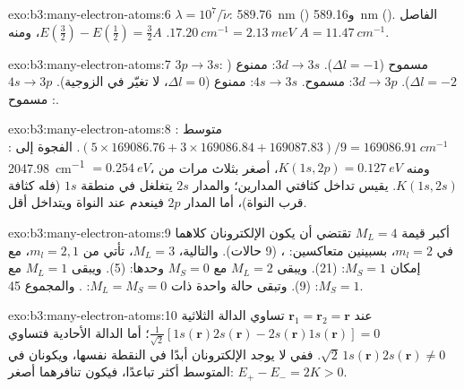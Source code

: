 \begin{solution}{exo:b3:many-electron-atoms:6}
$\lambda = 10^7/\tilde\nu$: \qty{589.76}{nm} () و\qty{589.16}{nm}
(). الفاصل $\qty{17.20}{cm^{-1}} = \qty{2.13}{meV}$. $E(\frac32) -
E(\frac12) = \frac32A$، ومنه $A = \qty{11.47}{cm^{-1}}$.
\end{solution}

\begin{solution}{exo:b3:many-electron-atoms:7}
$3p \to 3s$: مسموح ($\Delta l = -1$). $3d \to 3s$: ممنوع ($\Delta l = -2$).
$3d \to 3p$: مسموح. $4s \to 3s$: ممنوع ($\Delta l = 0$، لا تغيّر في
الزوجية). $4s \to 3p$: مسموح.
\end{solution}

\begin{solution}{exo:b3:many-electron-atoms:8}
متوسط : $(5 \times 169086.76 + 3 \times 169086.84 + 169087.83)/9 =
\qty{169086.91}{cm^{-1}}$. الفجوة إلى : \qty{2047.98}{cm^{-1}} $=
\qty{0.254}{eV}$، ومنه $K(1s,2p) = \qty{0.127}{eV}$، أصغر بثلاث مرات من
$K(1s,2s)$.  يقيس تداخل كثافتي
المدارين؛ والمدار $2s$ يتغلغل في منطقة $1s$ (فله كثافة
قرب النواة)، أما المدار $2p$ فينعدم عند النواة ويتداخل أقل.
\end{solution}

\begin{solution}{exo:b3:many-electron-atoms:9}
أكبر قيمة $M_L = 4$ تقتضي أن يكون الإلكترونان كلاهما في $m_l = 2$، بسبينين متعاكسين: ،  (9 حالات). والتالية، $M_L = 3$، تأتي من $m_l = 2, 1$، مع
إمكان $M_S = 1$:  (21). ويبقى $M_L = 2$ مع $M_S = 0$ وحدها:
 (5). ويبقى $M_L = 1$ مع $M_S = 1$:  (9). وتبقى حالة واحدة ذات
$M_L = M_S = 0$: . والمجموع 45.
\end{solution}

\begin{solution}{exo:b3:many-electron-atoms:10}
عند $\mathbf r_1 = \mathbf r_2 = \mathbf r$ تساوي الدالة الثلاثية
$\frac{1}{\sqrt2}[1s(\mathbf r)2s(\mathbf r) - 2s(\mathbf r)1s(\mathbf r)] = 0$؛ أما
الدالة الأحادية فتساوي $\sqrt2\,1s(\mathbf r)2s(\mathbf r) \ne 0$. ففي  لا
يوجد الإلكترونان أبدًا في النقطة نفسها، ويكونان في المتوسط أكثر
تباعدًا، فيكون تنافرهما أصغر: $E_+ - E_- = 2K > 0$.
\end{solution}

